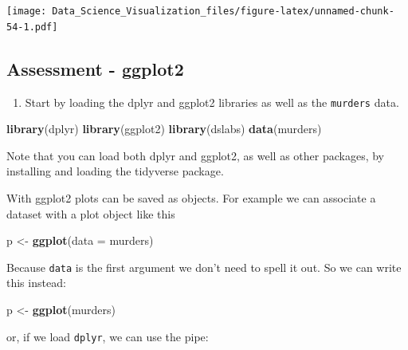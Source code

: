 \documentclass[
]{article}
\newenvironment{Shaded}{\begin{snugshade}}{\end{snugshade}}
\newcommand{\DataTypeTok}[1]{\textcolor[rgb]{0.13,0.29,0.53}{#1}}
\newcommand{\KeywordTok}[1]{\textcolor[rgb]{0.13,0.29,0.53}{\textbf{#1}}}
\newcommand{\NormalTok}[1]{#1}
\newcommand{\OperatorTok}[1]{\textcolor[rgb]{0.81,0.36,0.00}{\textbf{#1}}}
\newcommand{\StringTok}[1]{\textcolor[rgb]{0.31,0.60,0.02}{#1}}
\providecommand{\tightlist}{%
  \setlength{\itemsep}{0pt}\setlength{\parskip}{0pt}}
\begin{document}
\texttt{[image: Data\_Science\_Visualization\_files/figure-latex/unnamed-chunk-54-1.pdf]}

\hypertarget{assessment---ggplot2}{%
\subsection{Assessment - ggplot2}\label{assessment---ggplot2}}

\begin{enumerate}
\def\labelenumi{\arabic{enumi}.}
\tightlist
\item
  Start by loading the dplyr and ggplot2 libraries as well as the
  \texttt{murders} data.
\end{enumerate}

\begin{Shaded}
\begin{Highlighting}[]
\KeywordTok{library}\NormalTok{(dplyr)}
\KeywordTok{library}\NormalTok{(ggplot2)}
\KeywordTok{library}\NormalTok{(dslabs)}
\KeywordTok{data}\NormalTok{(murders)}
\end{Highlighting}
\end{Shaded}

Note that you can load both dplyr and ggplot2, as well as other
packages, by installing and loading the tidyverse package.

With ggplot2 plots can be saved as objects. For example we can associate
a dataset with a plot object like this

\begin{Shaded}
\begin{Highlighting}[]
\NormalTok{p <-}\StringTok{ }\KeywordTok{ggplot}\NormalTok{(}\DataTypeTok{data =}\NormalTok{ murders)}
\end{Highlighting}
\end{Shaded}

Because \texttt{data} is the first argument we don't need to spell it
out. So we can write this instead:

\begin{Shaded}
\begin{Highlighting}[]
\NormalTok{p <-}\StringTok{ }\KeywordTok{ggplot}\NormalTok{(murders)}
\end{Highlighting}
\end{Shaded}

or, if we load \texttt{dplyr}, we can use the pipe:

\begin{Shaded}
\end{Shaded}
\end{document}
